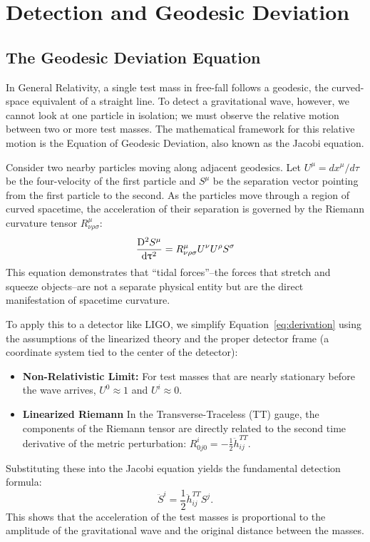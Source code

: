 \section{Detection and Geodesic Deviation}
\label{sec:detection_and_geodesic_deviation}

\subsection{The Geodesic Deviation Equation} In General Relativity, a single test mass in free-fall follows a geodesic, the curved-space equivalent of a straight line. To detect a gravitational wave, however, we cannot look at one particle in isolation; we must observe the relative motion between two or more test masses. The mathematical framework for this relative motion is the Equation of Geodesic Deviation, also known as the Jacobi equation.

Consider two nearby particles moving along adjacent geodesics. Let $U^\mu = dx^\mu / d\tau$ be the four-velocity of the first particle and $S^\mu$ be the separation vector pointing from the first particle to the second. As the particles move through a region of curved spacetime, the acceleration of their separation is governed by the Riemann curvature tensor $R^\mu_{\nu\rho\sigma}$:
\begin{equation}\label{eq:derivation}
  \codv[2]{S^\mu}{\tau} = R^\mu_{\nu\rho\sigma} U^\nu U^\rho S^\sigma
\end{equation}
This equation demonstrates that ``tidal forces''--the forces that stretch and squeeze objects--are not a separate physical entity but are the direct manifestation of spacetime curvature.

To apply this to a detector like LIGO, we simplify Equation~\ref{eq:derivation} using the assumptions of the linearized theory and the proper detector frame (a coordinate system tied to the center of the detector):
\begin{itemize}
  \item \textbf{Non-Relativistic Limit:} For test masses that are nearly stationary before the wave arrives, $U^0 \approx 1$ and $U^i \approx 0$.
  \item \textbf{Linearized Riemann} In the Transverse-Traceless (TT) gauge, the components of the Riemann tensor are directly related to the second time derivative of the metric perturbation: $R^i_{ 0j0} = -\frac{1}{2} \ddot{h}^{TT}_{ij}$.
\end{itemize}

Substituting these into the Jacobi equation yields the fundamental detection formula:
\[%
  \ddot{S}^i = \frac{1}{2} \ddot{h}^{TT}_{ij} S^j
.\]%
This shows that the acceleration of the test masses is proportional to the amplitude of the gravitational wave and the original distance between the masses.

